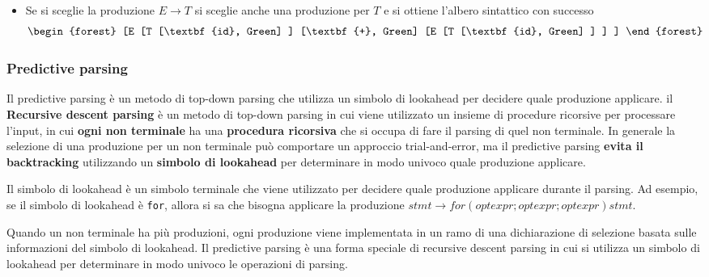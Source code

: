 \documentclass[a4paper]{article}
\begin{document}
\begin{example}
\begin{enumerate}
\begin{itemize}
        \item Se si sceglie la produzione \( E \to T \) si sceglie anche una produzione
          per \( T \) e si ottiene l'albero sintattico con successo
        \[
          \begin{forest}
            [E
              [T
                [\textbf{id}, Green]
              ]
              [\textbf{+}, Green]
              [E
                [T
                  [\textbf{id}, Green]
                ]
              ]
            ]
          \end{forest}
        \] 
      \end{itemize}
  \end{enumerate}
\end{example}


\subsubsection{Predictive parsing}
Il predictive parsing è un metodo di top-down parsing che utilizza un simbolo di lookahead
per decidere quale produzione applicare. il \textbf{Recursive descent parsing} è un
metodo di top-down parsing in cui viene utilizzato un insieme di procedure ricorsive
per processare l'input, in cui \textbf{ogni non terminale} ha una \textbf{procedura ricorsiva} che si
occupa di fare il parsing di quel non terminale.
In generale la selezione di una produzione per un non terminale può comportare
un approccio trial-and-error, ma il predictive parsing \textbf{evita il backtracking}
utilizzando un \textbf{simbolo di lookahead} per determinare in modo univoco quale produzione
applicare.

\begin{definition}
  Il simbolo di lookahead è un simbolo terminale che viene utilizzato per decidere quale
  produzione applicare durante il parsing. Ad esempio, se il simbolo di lookahead è
  \texttt{for}, allora si sa che bisogna applicare la produzione \( stmt \to for (optexpr; optexpr; optexpr) stmt \).
\end{definition}

\noindent
Quando un non terminale ha più produzioni, ogni produzione viene implementata in
un ramo di una dichiarazione di selezione basata sulle informazioni del simbolo di
lookahead. Il predictive parsing è una forma speciale di recursive descent parsing
in cui si utilizza un simbolo di lookahead per determinare in modo univoco le operazioni
di parsing.
\end{document}
